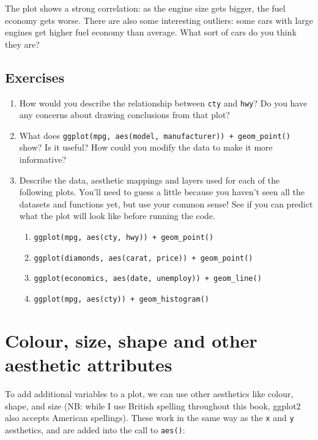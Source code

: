 The plot shows a strong correlation: as the engine size gets bigger, the
fuel economy gets worse. There are also some interesting outliers: some
cars with large engines get higher fuel economy than average. What sort
of cars do you think they are?

\subsection{Exercises}\label{exercises-1}

\begin{enumerate}
\def\labelenumi{\arabic{enumi}.}
\item
  How would you describe the relationship between \texttt{cty} and
  \texttt{hwy}? Do you have any concerns about drawing conclusions from
  that plot?
\item
  What does
  \texttt{ggplot(mpg,\ aes(model,\ manufacturer))\ +\ geom\_point()}
  show? Is it useful? How could you modify the data to make it more
  informative?
\item
  Describe the data, aesthetic mappings and layers used for each of the
  following plots. You'll need to guess a little because you haven't
  seen all the datasets and functions yet, but use your common sense!
  See if you can predict what the plot will look like before running the
  code.

  \begin{enumerate}
  \def\labelenumii{\arabic{enumii}.}
  \tightlist
  \item
    \texttt{ggplot(mpg,\ aes(cty,\ hwy))\ +\ geom\_point()}
  \item
    \texttt{ggplot(diamonds,\ aes(carat,\ price))\ +\ geom\_point()}
  \item
    \texttt{ggplot(economics,\ aes(date,\ unemploy))\ +\ geom\_line()}
  \item
    \texttt{ggplot(mpg,\ aes(cty))\ +\ geom\_histogram()}
  \end{enumerate}
\end{enumerate}

\hypertarget{aesthetics}{\section{Colour, size, shape and other
aesthetic attributes}\label{aesthetics}}

To add additional variables to a plot, we can use other aesthetics like
colour, shape, and size (NB: while I use British spelling throughout
this book, ggplot2 also accepts American spellings). These work in the
same way as the \texttt{x} and \texttt{y} aesthetics, and are added into
the call to \texttt{aes()}:  

